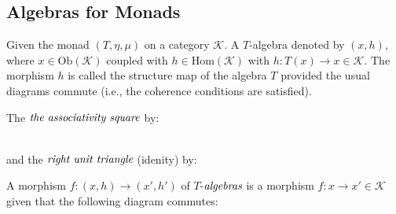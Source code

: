 \documentclass[10pt, oneside, reqno]{amsart}
\theoremstyle{plain}%
\theoremstyle{definition}
\theoremstyle{remark}
\newcommand{\Id}{\mathit{id}_}
\begin{document}
\subsection{Algebras for Monads} %
\label{sec:monadalgebra}
Given the monad $(T, \eta, \mu)$ on a category $\mathcal{K}$. A $T$-algebra denoted by $(x,h)$,
where $x \in \text{Ob}(\mathcal{K})$ coupled with $h \in \text{Hom}(\mathcal{K})$ with
$h: T(x) \to x \in \mathcal{K}$. The morphism $h$ is called the structure map of the algebra $T$ provided
the usual diagrams commute (i.e., the coherence conditions are satisfied).

The $\emph{the associativity square}$ by:
\\
and the $\emph{right unit triangle}$ (idenity) by:

A morphism $f: (x,h) \to (x',h')$ of $T$-$\emph{algebras}$ is a morphism $f: x \to x' \in \mathcal{K}$
given that the following diagram commutes:
\end{document}
